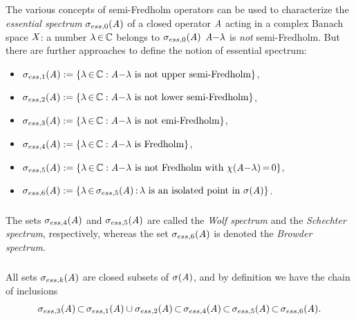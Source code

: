 \documentclass[11pt,twoside]{article}
\begin{document}
\subsection{} %
The various concepts of semi-Fredholm operators can be used to characterize
the \textit{essential spectrum} $\sigma_{ess,0}(\mathit{A})$
of a closed operator $\mathit{A}$ acting in a complex Banach space $\mathit{X}$:
a number $\lambda {\,\in\,} {\mathbb{C}}$ belongs to $\sigma_{ess,0}(\mathit{A})$
\iff $\mathit{A} {-} \lambda$ is \textit{not} semi-Fredholm.
But there are further approaches to define the notion of essential spectrum:

\begin{itemize}[leftmargin=6mm]
\item[\,] 
$\sigma_{ess,1}(\mathit{A}) := \{\lambda {\,\in\,} {\mathbb{C}}:
\mathit{A} {-} \lambda \mbox{ is not upper semi-Fredholm} \}$,

\item[\,] 
$\sigma_{ess,2}(\mathit{A}) := \{\lambda {\,\in\,} {\mathbb{C}}:
\mathit{A} {-} \lambda \mbox{ is not lower semi-Fredholm} \}$,

\item[\,] 
$\sigma_{ess,3}(\mathit{A}) := \{\lambda {\,\in\,} {\mathbb{C}}:
\mathit{A} {-} \lambda \mbox{ is not emi-Fredholm} \}$,

\item[\,] 
$\sigma_{ess,4}(\mathit{A}) := \{\lambda {\,\in\,} {\mathbb{C}}:
\mathit{A} {-} \lambda \mbox{ is Fredholm} \}$,

\item[\,] 
$\sigma_{ess,5}(\mathit{A}) := \{\lambda {\,\in\,} {\mathbb{C}}:
\mathit{A} {-} \lambda \mbox{ is not Fredholm with } \chi(\mathit{A} {-} \lambda) {\,=\,} 0\}$,

\item[\,] 
$\sigma_{ess,6}(\mathit{A}) := \{\lambda {\,\in\,} \sigma_{ess,5}(\mathit{A}) {\,:\,}
\lambda \mbox{ is an isolated point in } \sigma(\mathit{A})\}$.
\end{itemize}

\subparagraph{} %
The sets $\sigma_{ess,4}(\mathit{A})$ and $\sigma_{ess,5}(\mathit{A})$
are called the \textit{Wolf spectrum} and the \textit{Schechter spectrum},
respectively,
whereas the set $\sigma_{ess,6}(\mathit{A})$ is denoted
the \textit{Browder spectrum}.

\subparagraph{}
All sets $\sigma_{ess,k}(\mathit{A})$ are closed subsets of $\sigma(\mathit{A})$,
and by definition we have the chain of inclusions 
\[
\sigma_{ess,3}(\mathit{A}) {\,\subset\,}
\sigma_{ess,1}(\mathit{A}) \cup
\sigma_{ess,2}(\mathit{A}) {\,\subset\,}
\sigma_{ess,4}(\mathit{A}) {\,\subset\,}
\sigma_{ess,5}(\mathit{A}) {\,\subset\,}
\sigma_{ess,6}(\mathit{A}).
\]
\end{document}
